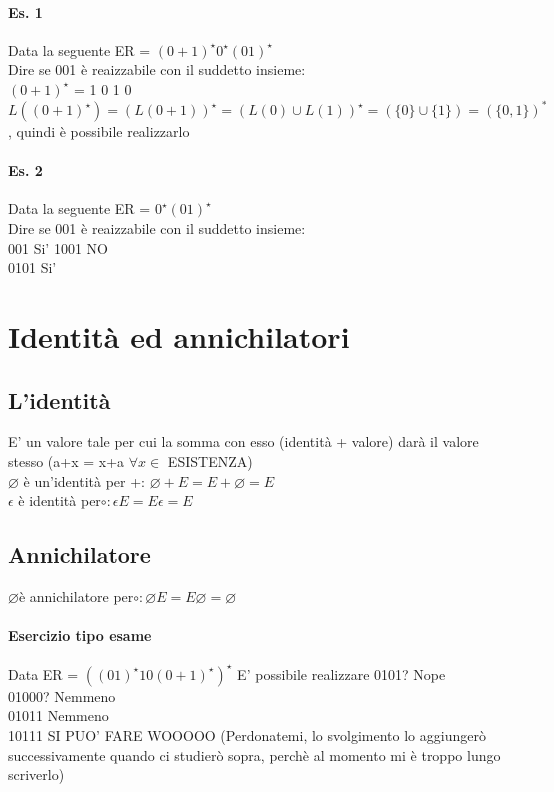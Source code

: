 \documentclass[12pt, a4paper, openany, oneside]{book}
\begin{document}
\paragraph{Es. 1}
Data la seguente ER = $(0+1)^{\star} 0^{\star} (01)^{\star}$ \\
Dire se 001 è reaizzabile con il suddetto insieme: \\
$(0+1)^{\star}$ = 1 0 1 0\\
$L((0+1)^{\star}) = (L(0+1))^{\star} = (L(0)\cup L(1))^{\star} = (\{0\} \cup \{1\})
= (\{0,1\})^{*}$, quindi è possibile realizzarlo
\paragraph{Es. 2}
Data la seguente ER = $0^{\star} (01)^{\star}$ \\
Dire se 001 è reaizzabile con il suddetto insieme: \\
001 Si'
1001 NO \\
0101 Si' \\
\section{Identità ed annichilatori}
\subsection{L'identità} E' un valore tale per cui la somma con esso (identità +
valore) darà il valore stesso (a+x = x+a $\forall x \in$ ESISTENZA)\\
$\varnothing$ è un'identità per +: $\varnothing + E = E + \varnothing = E$ \\
$\epsilon$ è identità per$ \circ: \epsilon E = E\epsilon = E$ \\
\subsection{Annichilatore}
$\varnothing $è annichilatore per$ \circ: \varnothing E = E \varnothing = \varnothing$
\paragraph{Esercizio tipo esame}
Data ER = $((01)^{\star}10(0+1)^{\star})^{\star}$
E' possibile realizzare 0101? Nope\\
01000? Nemmeno \\
01011 Nemmeno \\
10111 SI PUO' FARE WOOOOO (Perdonatemi, lo svolgimento lo aggiungerò successivamente
quando ci studierò sopra, perchè al momento mi è troppo lungo scriverlo)
\end{document}
